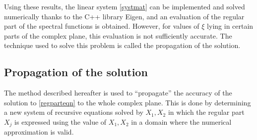 Using these results, the linear system \eqref{systmat} can be implemented and solved numerically thanks to the C++ library Eigen, and an evaluation of the regular part of the spectral functions is obtained. However, for values of $\xi$ lying in certain parts of the complex plane, this evaluation is not sufficiently accurate. The technique used to solve this problem is called the propagation of the solution.

\subsection{Propagation of the solution}
\label{C3:propag}
The method described hereafter is used to ``propagate''  the accuracy of the solution to \eqref{regparteqn} to the whole complex plane. This is done by determining a new system of recursive equations solved by $X_1, X_2$ in which the regular part $X_j$ is expressed using the value of $X_1, X_2$ in a domain where the numerical approximation is valid.

